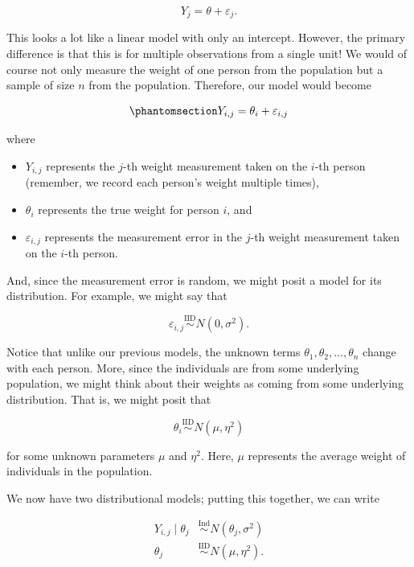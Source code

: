\documentclass[
  letterpaper,
  DIV=11,
  numbers=noendperiod]{scrreprt}
\providecommand{\tightlist}{%
  \setlength{\itemsep}{0pt}\setlength{\parskip}{0pt}}\usepackage{longtable,booktabs,array}
\theoremstyle{definition}
\theoremstyle{plain}
\theoremstyle{definition}
\theoremstyle{remark}
\begin{document}
\[Y_j = \theta + \varepsilon_j.\]

This looks a lot like a linear model with only an intercept. However,
the primary difference is that this is for multiple observations from a
single unit! We would of course not only measure the weight of one
person from the population but a sample of size \(n\) from the
population. Therefore, our model would become

\begin{equation}\phantomsection\label{eq-hier-one}{Y_{i,j} = \theta_i + \varepsilon_{i,j}}\end{equation}

where

\begin{itemize}
\tightlist
\item
  \(Y_{i,j}\) represents the \(j\)-th weight measurement taken on the
  \(i\)-th person (remember, we record each person's weight multiple
  times),
\item
  \(\theta_i\) represents the true weight for person \(i\), and
\item
  \(\varepsilon_{i,j}\) represents the measurement error in the \(j\)-th
  weight measurement taken on the \(i\)-th person.
\end{itemize}

And, since the measurement error is random, we might posit a model for
its distribution. For example, we might say that

\[\varepsilon_{i,j} \stackrel{\text{IID}}{\sim} N\left(0, \sigma^2\right).\]

Notice that unlike our previous models, the unknown terms
\(\theta_1, \theta_2, \dotsc, \theta_n\) change with each person. More,
since the individuals are from some underlying population, we might
think about their weights as coming from some underlying distribution.
That is, we might posit that

\[\theta_i \stackrel{\text{IID}}{\sim} N\left(\mu, \eta^2\right)\]

for some unknown parameters \(\mu\) and \(\eta^2\). Here, \(\mu\)
represents the average weight of individuals in the population.

We now have two distributional models; putting this together, we can
write

\[
\begin{aligned}
  Y_{i,j} \mid \theta_j &\stackrel{\text{Ind}}{\sim} N\left(\theta_j, \sigma^2\right) \\
  \theta_j &\stackrel{\text{IID}}{\sim} N\left(\mu, \eta^2\right).
\end{aligned}
\]
\end{document}
